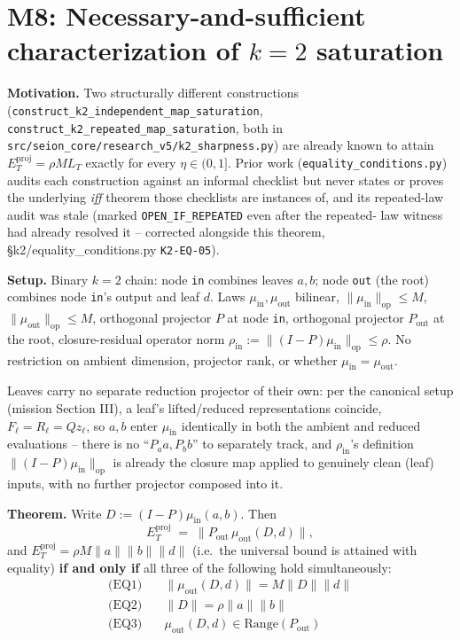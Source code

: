 \section*{M8: Necessary-and-sufficient characterization of $k=2$ saturation}
\label{sec:k2-iff}

\textbf{Motivation.} Two structurally different constructions
(\texttt{construct\_k2\_independent\_map\_saturation},
\texttt{construct\_k2\_repeated\_map\_saturation}, both in
\texttt{src/seion\_core/research\_v5/k2\_sharpness.py}) are already known to
attain $E_T^{\mathrm{proj}}=\rho M L_T$ exactly for every $\eta\in(0,1]$.
Prior work (\texttt{equality\_conditions.py}) audits each construction
against an informal checklist but never states or proves the underlying
\emph{iff} theorem those checklists are instances of, and its repeated-law
audit was stale (marked \texttt{OPEN\_IF\_REPEATED} even after the repeated-
law witness had already resolved it -- corrected alongside this theorem,
\S k2/equality\_conditions.py \texttt{K2-EQ-05}).

\textbf{Setup.} Binary $k=2$ chain: node \texttt{in} combines leaves
$a,b$; node \texttt{out} (the root) combines node \texttt{in}'s output and
leaf $d$. Laws $\mu_{\mathrm{in}},\mu_{\mathrm{out}}$ bilinear,
$\|\mu_{\mathrm{in}}\|_{\mathrm{op}}\le M$, $\|\mu_{\mathrm{out}}\|_{\mathrm
{op}}\le M$, orthogonal projector $P$ at node \texttt{in}, orthogonal
projector $P_{\mathrm{out}}$ at the root, closure-residual operator norm
$\rho_{\mathrm{in}}:=\|(I-P)\mu_{\mathrm{in}}\|_{\mathrm{op}}\le\rho$. No
restriction on ambient dimension, projector rank, or whether
$\mu_{\mathrm{in}}=\mu_{\mathrm{out}}$.

Leaves carry no separate reduction projector of their own: per the
canonical setup (mission Section III), a leaf's lifted/reduced
representations coincide, $F_\ell=R_\ell=Qz_\ell$, so $a,b$ enter
$\mu_{\mathrm{in}}$ identically in both the ambient and reduced
evaluations -- there is no ``$P_aa,P_bb$'' to separately track, and
$\rho_{\mathrm{in}}$'s definition $\|(I-P)\mu_{\mathrm{in}}\|_{\mathrm{op}}$
is already the closure map applied to genuinely clean (leaf) inputs, with
no further projector composed into it.

\textbf{Theorem.} Write $D:=(I-P)\mu_{\mathrm{in}}(a,b)$. Then
\[
  E_T^{\mathrm{proj}} \;=\; \big\| P_{\mathrm{out}}\,\mu_{\mathrm{out}}(D,d) \big\|,
\]
and $E_T^{\mathrm{proj}} = \rho M \|a\|\|b\|\|d\|$ (i.e.\ the universal
bound is attained with equality) \textbf{if and only if} all three of the
following hold simultaneously:
\begin{align}
  \text{(EQ1)}\quad & \|\mu_{\mathrm{out}}(D,d)\| = M\|D\|\|d\| \tag{outer law saturates $M$ on $(D,d)$}\\
  \text{(EQ2)}\quad & \|D\| = \rho\|a\|\|b\| \tag{closure map saturates $\rho$ on $(a,b)$}\\
  \text{(EQ3)}\quad & \mu_{\mathrm{out}}(D,d)\in\mathrm{Range}(P_{\mathrm{out}}) \tag{root projection loses nothing}
\end{align}

